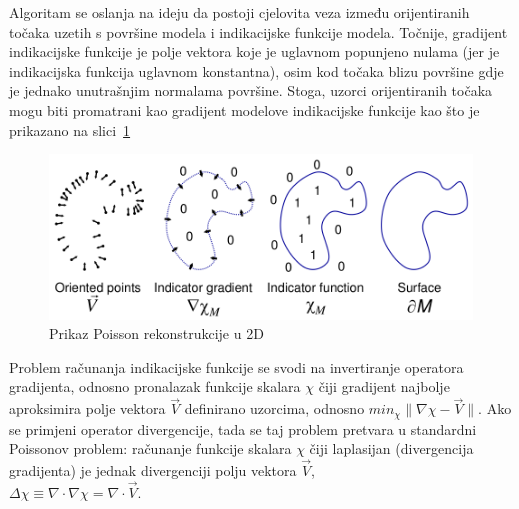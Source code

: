 Algoritam se oslanja na ideju da postoji cjelovita veza između
orijentiranih točaka uzetih s površine modela i indikacijske funkcije
modela. Točnije, gradijent indikacijske funkcije je polje vektora koje
je uglavnom popunjeno nulama (jer je indikacijska funkcija uglavnom
konstantna), osim kod točaka blizu površine gdje je jednako unutrašnjim
normalama površine. Stoga, uzorci orijentiranih točaka mogu biti
promatrani kao gradijent modelove indikacijske funkcije kao što je
prikazano na slici~\ref{fig:poisson-reconstruction.png}

\begin{figure}[h]
\centering
\includegraphics[scale=0.35]{figures/poisson-reconstruction.png}
\caption{Prikaz Poisson rekonstrukcije u 2D}
\label{fig:poisson-reconstruction.png}
\end{figure}

Problem računanja indikacijske funkcije se svodi na invertiranje
operatora gradijenta, odnosno pronalazak funkcije skalara \(\chi\) čiji
gradijent najbolje aproksimira polje vektora \(\vec{V}\) definirano
uzorcima, odnosno \(min_\chi \|\nabla\chi - \vec{V}\|\). Ako se primjeni
operator divergencije, tada se taj problem pretvara u standardni
Poissonov problem: računanje funkcije skalara \(\chi\) čiji laplasijan
(divergencija gradijenta) je jednak divergenciji polju vektora
\(\vec{V}\),
\\
\(\Delta \chi \equiv \nabla \cdot \nabla\chi = \nabla \cdot \vec{V}\).



